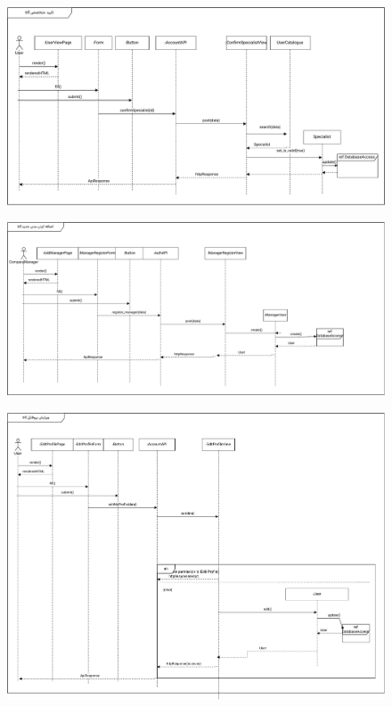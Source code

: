 \eject \pdfpagewidth=11in \pdfpageheight=7in
\begin{figure}[ht!]
	\centering
	\includegraphics[scale=0.8]{figs/design-sequence/3-6.pdf}
\end{figure}
\FloatBarrier
\newpage


\eject \pdfpagewidth=13in \pdfpageheight=10in
\begin{figure}[ht!]
	\centering
	\includegraphics[scale=0.8]{figs/design-sequence/3-7.pdf}
\end{figure}
\FloatBarrier
\newpage

\eject \pdfpagewidth=13in \pdfpageheight=10in
\begin{figure}[ht!]
	\centering
	\includegraphics[scale=0.8]{figs/design-sequence/3-8.pdf}
\end{figure}
\FloatBarrier
\newpage

